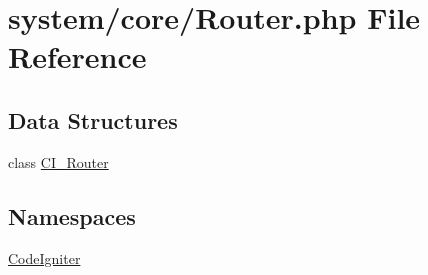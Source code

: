 \hypertarget{_router_8php}{\section{system/core/\-Router.php File Reference}
\label{_router_8php}
}
\subsection*{Data Structures}
\begin{DoxyCompactItemize}
\item 
class \hyperlink{class_c_i___router}{C\-I\-\_\-\-Router}
\end{DoxyCompactItemize}
\subsection*{Namespaces}
\begin{DoxyCompactItemize}
\item 
\hyperlink{namespace_code_igniter}{Code\-Igniter}
\end{DoxyCompactItemize}

